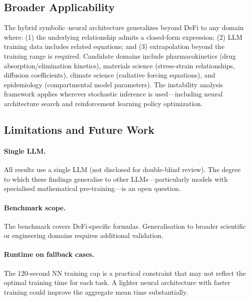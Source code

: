 \documentclass[twoside,11pt]{article}
\begin{document}
\subsection{Broader Applicability}\label{subsec:broader-applicability}
\label{sec:disc_broader}

The hybrid symbolic--neural architecture generalizes beyond DeFi to any domain where: (1) the underlying relationship admits a closed-form expression; (2) LLM training data includes related equations; and (3) extrapolation beyond the training range is required. Candidate domains include pharmacokinetics (drug absorption/elimination kinetics), materials science (stress-strain relationships, diffusion coefficients), climate science (radiative forcing equations), and epidemiology (compartmental model parameters). The instability analysis framework applies wherever stochastic inference is used---including neural architecture search and reinforcement learning policy optimization.

\subsection{Limitations and Future Work}\label{subsec:limitations-and-future-work}
\label{sec:limitations}

\paragraph{Single LLM.}
All results use a single LLM (not disclosed for double-blind review).
The degree to which these findings generalise to other LLMs---particularly
models with specialised mathematical pre-training---is an open question.

\paragraph{Benchmark scope.}
The benchmark covers DeFi-specific formulas.  Generalisation to broader scientific
or engineering domains requires additional validation.

\paragraph{Runtime on fallback cases.}
The 120-second NN training cap is a practical constraint that may not reflect the
optimal training time for each task.  A lighter neural architecture with faster
training could improve the aggregate mean time substantially.
\end{document}

